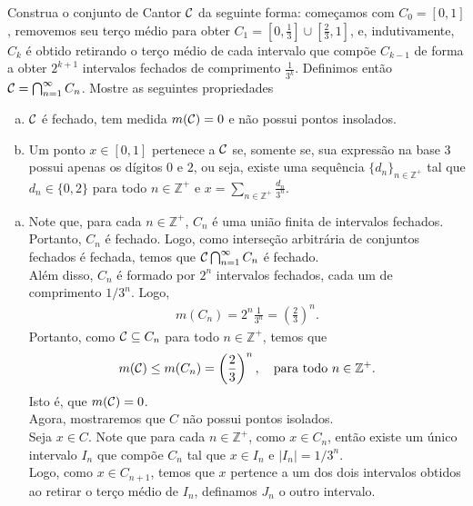 \begin{homeworkProblem}[2]
  Construa o conjunto de Cantor $\mathcal{C}$ da seguinte forma: começamos com $C_0=[0,1]$, removemos seu terço médio para obter $C_1=\left[0,\frac{1}{3}\right]\cup\left[\frac{2}{3},1\right]$, e, indutivamente, $C_k$ é obtido retirando o terço médio de cada intervalo que compõe $C_{k-1}$ de forma a obter $2^{k+1}$ intervalos fechados de comprimento $\frac{1}{3^k}$. Definimos então $\mathcal{C}=\bigcap_{n=1}^{\infty}C_n$. Mostre as seguintes propriedades
  \begin{enumerate}[a)]
    \item $\mathcal{C}$ é fechado, tem medida $m(\mathcal{C})=0$ e não possui pontos insolados.
    \item Um ponto $x\in[0,1]$ pertenece a $\mathcal{C}$ se, somente se, sua expressão na base $3$ possui apenas os dígitos $0$ e $2$, ou seja, existe uma sequência $\{d_n\}_{n\in\mathbb{Z}^{+}}$ tal que $d_n\in\{0,2\}$ para todo $n\in\mathbb{Z}^{+}$ e $x=\sum_{n\in\mathbb{Z}^{+}}\frac{d_n}{3^n}$.
  \end{enumerate}
  \begin{solution}
    \begin{enumerate}[a)]
      \item Note que, para cada $n\in\mathbb{Z}^{+}$, $C_n$ é uma união finita de intervalos fechados. Portanto, $C_n$ é fechado. Logo, como interseção arbitrária de conjuntos fechados é fechada, temos que $\mathcal{C}\bigcap_{n=1}^{\infty}C_n$ é fechado.\\
        Além disso, $C_n$ é formado por $2^n$ intervalos fechados, cada um de comprimento $1/3^n$. Logo,
        \begin{align*}
          m(C_n)=2^n\frac{1}{3^n}=\left(\frac{2}{3}\right)^n.
        \end{align*}
        Portanto, como $\mathcal{C}\subseteq C_n$ para todo $n\in\mathbb{Z}^{+}$, temos que
        \begin{align*}
          m(\mathcal{C})\leq m(C_n)=\left(\frac{2}{3}\right)^n,\quad\text{para todo }n\in\mathbb{Z}^{+}.
        \end{align*}
        Isto é, que $m(\mathcal{C})=0$.\\
        Agora, mostraremos que $C$ não possui pontos isolados.\\
        Seja $x\in C$. Note que para cada $n\in\mathbb{Z}^{+}$, como $x\in C_n$, então existe um único intervalo $I_n$ que compõe $C_n$ tal que $x\in I_n$ e $|I_n|=1/3^n$.\\
        Logo, como $x\in C_{n+1}$, temos que $x$ pertence a um dos dois intervalos obtidos ao retirar o terço médio de $I_n$, definamos $J_n$ o outro intervalo.\\

\end{enumerate}
\end{solution}
\end{homeworkProblem}
